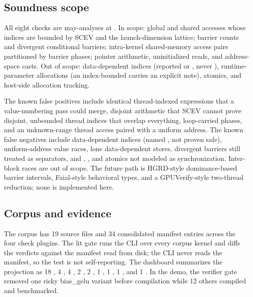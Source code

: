 \subsection{Soundness scope}
\label{sec:c3-soundness}

All eight checks are may-analyses at . In scope: global and shared
accesses whose indices are bounded by SCEV and the launch-dimension lattice;
barrier counts and divergent conditional barriers; intra-kernel shared-memory
access pairs partitioned by barrier phases; pointer arithmetic, uninitialized
reads, and address-space casts. Out of scope: data-dependent indices (reported
 or , never ), runtime-parameter
allocations (an index-bounded  carries an explicit note), atomics,
and host-side allocation tracking.

The known false positives include identical thread-indexed expressions that a
value-numbering pass could merge, disjoint arithmetic that SCEV cannot prove
disjoint, unbounded thread indices that overlap everything, loop-carried
phases, and an unknown-range thread access paired with a uniform address. The
known false negatives include data-dependent indices (named ,
not proven safe), uniform-address value races, lone data-dependent stores,
divergent barriers still treated as separators, and ,
, and atomics not modeled as synchronization.
Inter-block races are out of scope. The future path is HGRD-style
dominance-based barrier intervals, Faial-style behavioral types, and a
GPUVerify-style two-thread reduction; none is implemented here.

\subsection{Corpus and evidence}
\label{sec:c3-evidence}

The corpus has 19 source files and 34 consolidated manifest entries across
the four check plugins. The lit gate runs the CLI  over every
corpus kernel and diffs the verdicts against the manifest read from disk; the
CLI never reads the manifest, so the test is not self-reporting. The
dashboard summarizes the projection as 18 , 4 ,
4 , 2 , 2 ,
1 , 1 , 1 ,
and 1 . In the demo, the verifier gate removed one
risky bias\_gelu variant before compilation while 12 others compiled and
benchmarked.

